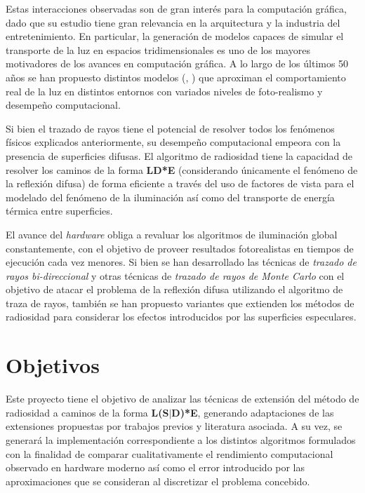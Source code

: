 Estas interacciones observadas son de gran interés para la computación gráfica, dado que su estudio tiene gran relevancia en la arquitectura y la industria del entretenimiento. En particular, la generación de modelos capaces de simular el transporte de la luz en espacios tridimensionales es uno de los mayores motivadores de los avances en computación gráfica. A lo largo de los últimos 50 años se han propuesto distintos modelos (\cite{Kajiya}, \cite{Cohen}) que aproximan el comportamiento real de la luz en distintos entornos con variados niveles de foto-realismo y desempeño computacional.

Si bien el trazado de rayos tiene el potencial de resolver todos los fenómenos físicos explicados anteriormente, su desempeño computacional empeora con la presencia de superficies difusas. El algoritmo de radiosidad tiene la capacidad de resolver los caminos de la forma \textbf{LD*E} (considerando únicamente el fenómeno de la reflexión difusa) de forma eficiente a través del uso de factores de vista para el modelado del fenómeno de la iluminación así como del transporte de energía térmica entre superficies.

El avance del \textit{hardware} obliga a revaluar los algoritmos de iluminación global constantemente, con el objetivo de proveer resultados fotorealistas en tiempos de ejecución cada vez menores. Si bien se han desarrollado las técnicas de \textit{trazado de rayos bi-direccional} y otras técnicas de \textit{trazado de rayos de Monte Carlo} con el objetivo de atacar el problema de la reflexión difusa utilizando el algoritmo de traza de rayos, también se han propuesto variantes que extienden los métodos de radiosidad para considerar los efectos introducidos por las superficies especulares.


\section{Objetivos}
\label{sec:objetivos}

Este proyecto tiene el objetivo de analizar las técnicas de extensión del método de radiosidad a caminos de la forma \textbf{L(S$|$D)*E}, generando adaptaciones de las extensiones propuestas por trabajos previos y literatura asociada. A su vez, se generará la implementación correspondiente a los distintos algoritmos formulados con la finalidad de comparar cualitativamente el rendimiento computacional observado en hardware moderno así como el error introducido por las aproximaciones que se consideran al discretizar el problema concebido.

